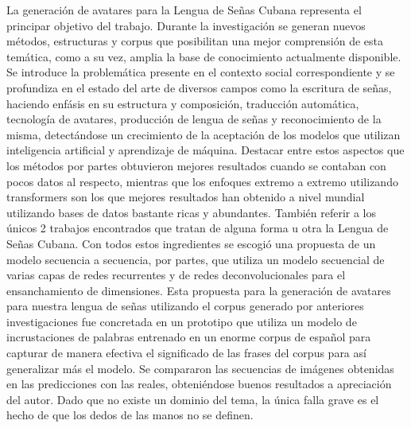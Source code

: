 \begin{conclusions}
  La generación de avatares para la Lengua de Señas Cubana representa el principar objetivo del trabajo. Durante la investigación se generan nuevos métodos, estructuras y corpus que posibilitan una mejor comprensión de esta temática, como a su vez, amplia la base de conocimiento actualmente disponible.
 	Se introduce la problemática presente en el contexto social correspondiente y se profundiza en el estado del arte de diversos campos como la escritura de señas, haciendo enfásis en su estructura y composición,  traducción automática, tecnología de avatares, producción de lengua de señas y reconocimiento de la misma, detectándose un crecimiento de la aceptación de los modelos que utilizan inteligencia artificial y  aprendizaje de máquina.
 	Destacar entre estos aspectos que los métodos por partes obtuvieron mejores resultados cuando se contaban con pocos datos al respecto, mientras que los enfoques extremo a extremo utilizando transformers son los que mejores resultados han obtenido a nivel mundial utilizando bases de datos bastante ricas y abundantes. También referir a los únicos 2 trabajos encontrados que tratan de alguna forma u otra la Lengua de Señas Cubana.
 	Con todos estos ingredientes se escogió una propuesta de un modelo secuencia a secuencia, por partes, que utiliza un modelo secuencial de varias capas de redes recurrentes y  de redes deconvolucionales para el ensanchamiento de dimensiones. Esta propuesta para la generación de avatares para nuestra lengua de señas utilizando el corpus generado por anteriores investigaciones fue concretada en un prototipo que utiliza un modelo de incrustaciones de palabras entrenado en un enorme corpus de español para capturar de manera efectiva el significado de las frases del corpus para así generalizar más el modelo.
 	Se compararon las secuencias de imágenes obtenidas en las predicciones con las reales, obteniéndose buenos resultados a apreciación del autor. Dado que no existe un dominio del tema, la única falla grave es el hecho de que los dedos de las manos no se definen.  
 
\end{conclusions}
